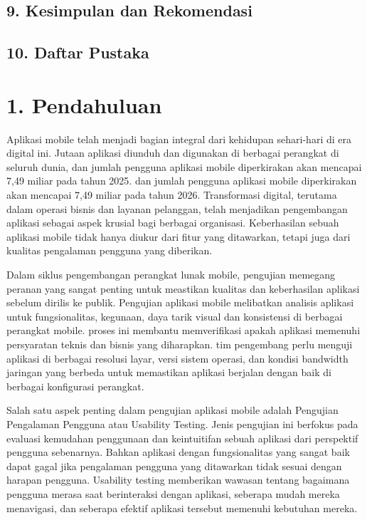 \subsection*{9. Kesimpulan dan Rekomendasi}
\subsection*{10. Daftar Pustaka}

\section*{1. Pendahuluan}
Aplikasi mobile telah menjadi bagian integral dari kehidupan sehari-hari di era digital ini. Jutaan aplikasi diunduh dan digunakan di berbagai perangkat di seluruh dunia, dan jumlah pengguna aplikasi mobile diperkirakan akan mencapai 7,49 miliar pada tahun 2025. dan jumlah pengguna aplikasi mobile diperkirakan akan mencapai 7,49 miliar pada tahun 2026. Transformasi digital, terutama dalam operasi bisnis dan layanan pelanggan, telah menjadikan pengembangan aplikasi sebagai aspek krusial bagi berbagai organisasi. Keberhasilan sebuah aplikasi mobile tidak hanya diukur dari fitur yang ditawarkan, tetapi juga dari kualitas pengalaman pengguna yang diberikan. 

Dalam siklus pengembangan perangkat lunak mobile, pengujian memegang peranan yang sangat penting untuk meastikan kualitas dan keberhasilan aplikasi sebelum dirilis ke publik. Pengujian aplikasi mobile melibatkan analisis aplikasi untuk fungsionalitas, kegunaan, daya tarik visual dan konsistensi di berbagai perangkat mobile. proses ini membantu memverifikasi apakah aplikasi memenuhi persyaratan teknis dan bisnis yang diharapkan. tim pengembang perlu menguji aplikasi di berbagai resolusi layar, versi sistem operasi, dan kondisi bandwidth jaringan yang berbeda untuk memastikan aplikasi berjalan dengan baik di berbagai konfigurasi perangkat. 

Salah satu aspek penting dalam pengujian aplikasi mobile adalah Pengujian Pengalaman Pengguna atau Usability Testing. Jenis pengujian ini berfokus pada evaluasi kemudahan penggunaan dan keintuitifan sebuah aplikasi dari perspektif pengguna sebenarnya. Bahkan aplikasi dengan fungsionalitas yang sangat baik dapat gagal jika pengalaman pengguna yang ditawarkan tidak sesuai dengan harapan pengguna. Usability testing memberikan wawasan tentang bagaimana pengguna merasa saat berinteraksi dengan aplikasi, seberapa mudah mereka menavigasi, dan seberapa efektif aplikasi tersebut memenuhi kebutuhan mereka.

